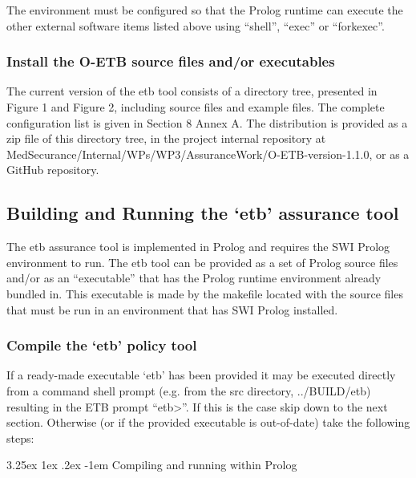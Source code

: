 \documentclass[12pt,twoside,a4paper]{article}
\makeatletter
\renewcommand\paragraph{\@startsection{paragraph}{5}{\z@}%
  {3.25ex \@plus1ex \@minus.2ex}%
  {-1em}%
  {\normalfont\normalsize\bfseries}}
\makeatother
\begin{document}
The environment must be configured so that the Prolog runtime can execute the other external software items listed above using ``shell'', ``exec'' or ``forkexec''.

\hypertarget{install-the-o-etb-source-files-andor-executables}{%
\subsubsection{Install the O-ETB source files and/or executables}\label{install-the-o-etb-source-files-andor-executables}}

The current version of the etb tool consists of a directory tree, presented in Figure 1 and Figure 2, including source files and example files. The complete configuration list is given in Section 8 Annex A. The distribution is provided as a zip file of this directory tree, in the project internal repository at MedSecurance/Internal/WPs/WP3/AssuranceWork/O-ETB-version-1.1.0, or as a GitHub repository.

\hypertarget{building-and-running-the-etb-assurance-tool}{%
\subsection{Building and Running the `etb' assurance tool}\label{building-and-running-the-etb-assurance-tool}}

The etb assurance tool is implemented in Prolog and requires the SWI Prolog environment to run. The etb tool can be provided as a set of Prolog source files and/or as an ``executable'' that has the Prolog runtime environment already bundled in. This executable is made by the makefile located with the source files that must be run in an environment that has SWI Prolog installed.

\hypertarget{compile-the-etb-policy-tool}{%
\subsubsection{Compile the `etb' policy tool}\label{compile-the-etb-policy-tool}}

If a ready-made executable `etb' has been provided it may be executed directly from a command shell prompt (e.g. from the src directory, ../BUILD/etb) resulting in the ETB prompt ``etb\textgreater''. If this is the case skip down to the next section. Otherwise (or if the provided executable is out-of-date) take the following steps:

\hypertarget{compiling-and-running-within-prolog}{%
\paragraph{Compiling and running within Prolog}\label{compiling-and-running-within-prolog}}
\end{document}
